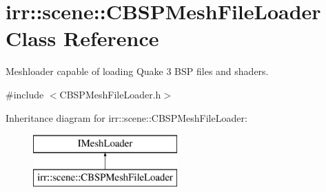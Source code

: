 \hypertarget{classirr_1_1scene_1_1_c_b_s_p_mesh_file_loader}{\section{irr\-:\-:scene\-:\-:C\-B\-S\-P\-Mesh\-File\-Loader Class Reference}
\label{classirr_1_1scene_1_1_c_b_s_p_mesh_file_loader}
}


Meshloader capable of loading Quake 3 B\-S\-P files and shaders.  




{\ttfamily \#include $<$C\-B\-S\-P\-Mesh\-File\-Loader.\-h$>$}

Inheritance diagram for irr\-:\-:scene\-:\-:C\-B\-S\-P\-Mesh\-File\-Loader\-:\begin{figure}[H]
\begin{center}
\leavevmode
\includegraphics[height=2.000000cm]{classirr_1_1scene_1_1_c_b_s_p_mesh_file_loader}
\end{center}
\end{figure}
